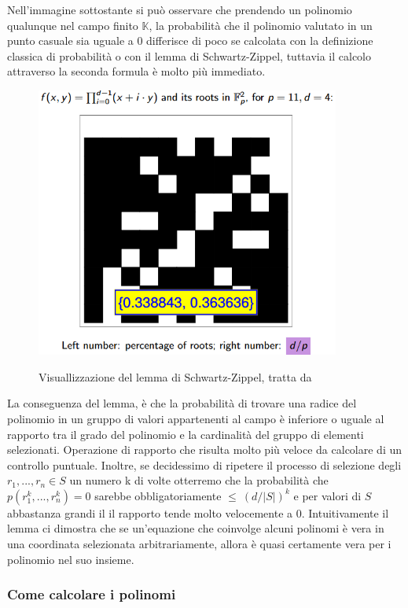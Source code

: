 Nell'immagine sottostante si può osservare che prendendo un polinomio qualunque nel campo finito $\mathbb{K}$, la
probabilità che il polinomio valutato in un punto casuale sia uguale a 0 differisce di poco se calcolata con la
definizione classica di probabilità o con il lemma di Schwartz-Zippel, tuttavia il calcolo attraverso la seconda formula è molto più immediato.
\begin{figure}[H]
    \centering
    \includegraphics[width=10cm]{./chapters/1.state-of-art/images/7.schwartz_zippel_lemma.png}
    \label{fig:schwartz-zippel-lemma}
    \captionsetup{justification=centering}
    \caption{Visuallizzazione del lemma di Schwartz-Zippel, tratta da \cite{23-schwartz-zippel}}
\end{figure}
\clearpage

La conseguenza del lemma, è che la probabilità di trovare una radice del polinomio in un gruppo di valori appartenenti al
campo è inferiore o uguale al rapporto tra il grado del polinomio e la cardinalità del gruppo di elementi selezionati.
Operazione di rapporto che risulta molto più veloce da calcolare di un controllo puntuale. Inoltre, se decidessimo di ripetere il processo di
selezione degli $r_1,...,r_n \in S$ un numero k di volte otterremo che la probabilità che $p(r^k_1,...,r^k_n) = 0$
sarebbe obbligatoriamente $\le \ (d/|S|)^k$  e per valori di $S$ abbastanza grandi il il rapporto tende molto velocemente
a 0. Intuitivamente il lemma ci dimostra che se un'equazione che coinvolge alcuni polinomi è vera in una coordinata
selezionata arbitrariamente, allora è quasi certamente vera per i polinomio nel suo insieme.

\subsubsection{Come calcolare i polinomi}

